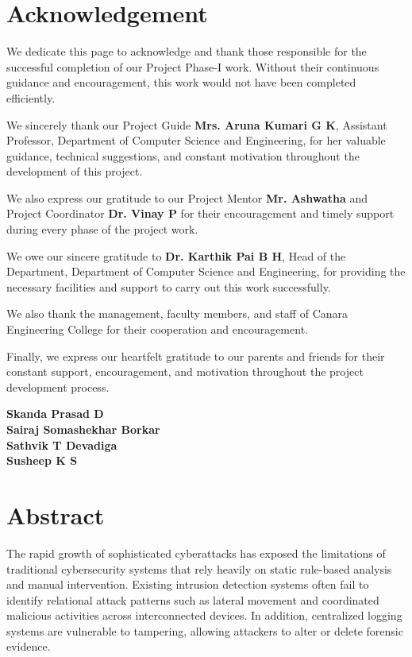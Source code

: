 \documentclass[12pt,a4paper]{report}
\newcommand{\studentAname}{Skanda Prasad D}
\newcommand{\studentBname}{Sairaj Somashekhar Borkar}
\newcommand{\studentCname}{Sathvik T Devadiga}
\newcommand{\studentDname}{Susheep K S}
\newcommand{\guidename}{Mrs. Aruna Kumari G K}
\newcommand{\coordinatorname}{Dr. Vinay P}
\newcommand{\hodname}{Dr. Karthik Pai B H}
\begin{document}
\chapter*{\centering Acknowledgement}
\noindent We dedicate this page to acknowledge and thank those responsible for the successful completion of our Project Phase-I work. Without their continuous guidance and encouragement, this work would not have been completed efficiently.
\par
\vspace{0.15in}
We sincerely thank our Project Guide \textbf{\guidename}, Assistant Professor, Department of Computer Science and Engineering, for her valuable guidance, technical suggestions, and constant motivation throughout the development of this project.
\par
\vspace{0.15in}
We also express our gratitude to our Project Mentor \textbf{Mr. Ashwatha} and Project Coordinator \textbf{\coordinatorname} for their encouragement and timely support during every phase of the project work.
\par
\vspace{0.15in}
We owe our sincere gratitude to \textbf{\hodname}, Head of the Department, Department of Computer Science and Engineering, for providing the necessary facilities and support to carry out this work successfully.
\par
\vspace{0.15in}
We also thank the management, faculty members, and staff of Canara Engineering College for their cooperation and encouragement.
\par
\vspace{0.15in}
Finally, we express our heartfelt gratitude to our parents and friends for their constant support, encouragement, and motivation throughout the project development process.
\par
\vspace{0.4in}

\begin{flushright}
\textbf{\studentAname} \\
\textbf{\studentBname} \\
\textbf{\studentCname} \\
\textbf{\studentDname} \\
\end{flushright}


\chapter*{\centering Abstract}
\noindent The rapid growth of sophisticated cyberattacks has exposed the limitations of traditional cybersecurity systems that rely heavily on static rule-based analysis and manual intervention. Existing intrusion detection systems often fail to identify relational attack patterns such as lateral movement and coordinated malicious activities across interconnected devices. In addition, centralized logging systems are vulnerable to tampering, allowing attackers to alter or delete forensic evidence.
\end{document}

